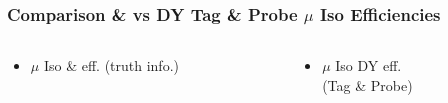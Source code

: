 \documentclass{beamer}
\begin{document}
\begin{frame}
 \frametitle{Comparison \ttbar \& \wpj vs DY Tag \& Probe $\mu$ Iso Efficiencies}
   \begin{columns}

   \begin{column}{0.33\textwidth}
     \begin{itemize}
   \item $\mu$ Iso \ttbar \& \wpj eff. (truth info.)
  \end{itemize}
   \end{column}
   \begin{column}{0.33\textwidth}
   \begin{itemize}
    \item $\mu$ Iso DY eff. \\(Tag \& Probe)
   \end{itemize}


\end{column}
\end{columns}
\end{frame}
\end{document}
